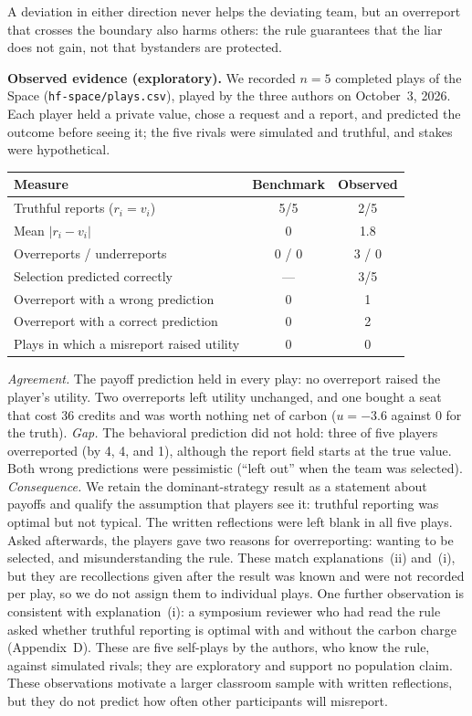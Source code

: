 \noindent
A deviation in either direction never helps the deviating team, but an overreport that crosses the boundary also harms others: the rule guarantees that the liar does not gain, not that bystanders are protected.

\vspace{3pt}

\noindent
\textbf{Observed evidence (exploratory).} We recorded $n=5$ completed plays of the Space (\texttt{hf-space/plays.csv}), played by the three authors on October~3, 2026. Each player held a private value, chose a request and a report, and predicted the outcome before seeing it; the five rivals were simulated and truthful, and stakes were hypothetical.

{\footnotesize
\begin{tabularx}{\columnwidth}{@{}Ycc@{}}\toprule
\textbf{Measure} & \textbf{Benchmark} & \textbf{Observed}\\\midrule
Truthful reports ($r_i=v_i$) & 5/5 & 2/5\\
Mean $|r_i-v_i|$ & 0 & 1.8\\
Overreports / underreports & 0 / 0 & 3 / 0\\
Selection predicted correctly & --- & 3/5\\
Overreport with a wrong prediction & 0 & 1\\
Overreport with a correct prediction & 0 & 2\\
Plays in which a misreport raised utility & 0 & 0\\\bottomrule
\end{tabularx}}

\vspace{3pt}

\noindent
\emph{Agreement.} The payoff prediction held in every play: no overreport raised the player's utility. Two overreports left utility unchanged, and one bought a seat that cost 36 credits and was worth nothing net of carbon ($u=-3.6$ against 0 for the truth). \emph{Gap.} The behavioral prediction did not hold: three of five players overreported (by 4, 4, and 1), although the report field starts at the true value. Both wrong predictions were pessimistic (``left out'' when the team was selected). \emph{Consequence.} We retain the dominant-strategy result as a statement about payoffs and qualify the assumption that players see it: truthful reporting was optimal but not typical. The written reflections were left blank in all five plays. Asked afterwards, the players gave two reasons for overreporting: wanting to be selected, and misunderstanding the rule. These match explanations~(ii) and~(i), but they are recollections given after the result was known and were not recorded per play, so we do not assign them to individual plays. One further observation is consistent with explanation~(i): a symposium reviewer who had read the rule asked whether truthful reporting is optimal with and without the carbon charge (Appendix~D). These are five self-plays by the authors, who know the rule, against simulated rivals; they are exploratory and support no population claim. These observations motivate a larger classroom sample with written reflections, but they do not predict how often other participants will misreport.

